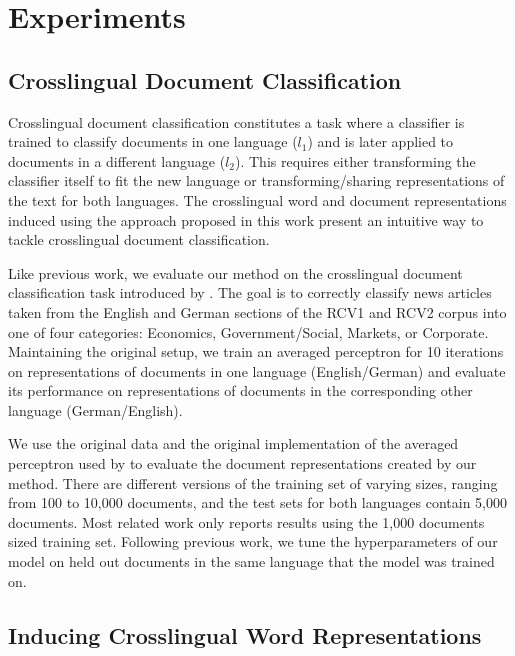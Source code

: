 \documentclass{article} \usepackage{iclr2015,times}
\begin{document}
\section{Experiments}

\subsection{Crosslingual Document Classification}

Crosslingual document classification constitutes a task where a classifier is
trained to classify documents in one language ($l_1$) and is later applied to
documents in a different language ($l_2$).
This requires either transforming the classifier itself to fit the new language
or transforming/sharing representations of the text for both languages.
The crosslingual word and document representations induced using the approach
proposed in this work present an intuitive way to tackle crosslingual
document classification.

Like previous work, we evaluate our method on the crosslingual
document classification task introduced by \citet{klementiev2012inducing}.
The goal is to correctly classify news articles taken from
the English and German sections of the RCV1 and RCV2 corpus
\citep{lewis2004rcv1} into one of four categories:
Economics, Government/Social, Markets, or Corporate.
Maintaining the original setup, we train an averaged perceptron
\citep{collins2002discriminative} for  10 iterations on representations of
documents in one language (English/German) and evaluate its performance on
representations of documents in the corresponding other language
(German/English).

We use the original data and the original implementation of the 
averaged perceptron used by \citet{klementiev2012inducing} to evaluate
the document representations created by our method.
There are different versions of the training set of varying sizes, ranging
from 100 to 10,000 documents, and the test sets for both languages contain
5,000 documents.
Most related work only reports results using the 1,000 documents sized
training set.
Following previous work, we tune the hyperparameters of our model on held out 
documents in the same language that the model was trained on.

\subsection{Inducing Crosslingual Word Representations}
\end{document}
